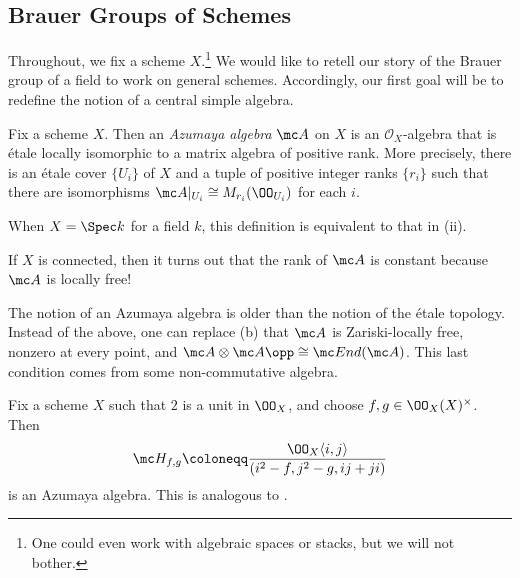 \documentclass[../notes.tex]{subfiles}
\begin{document}
\subsection{Brauer Groups of Schemes}
Throughout, we fix a scheme $X$.\footnote{One could even work with algebraic spaces or stacks, but we will not bother.} We would like to retell our story of the Brauer group of a field to work on general schemes. Accordingly, our first goal will be to redefine the notion of a central simple algebra.
\begin{definition}
	Fix a scheme $X$. Then an \textit{Azumaya algebra} $\mc A$ on $X$ is an $\mathcal O_X$-algebra that is \'etale locally isomorphic to a matrix algebra of positive rank. More precisely, there is an \'etale cover $\{U_i\}$ of $X$ and a tuple of positive integer ranks $\{r_i\}$ such that there are isomorphisms $\mc A|_{U_i}\cong M_{r_i}(\OO_{U_i})$ for each $i$.
\end{definition}
\begin{remark}
	When $X=\Spec k$ for a field $k$, this definition is equivalent to that in (ii).
\end{remark}
\begin{remark}
	If $X$ is connected, then it turns out that the rank of $\mc A$ is constant because $\mc A$ is locally free!
\end{remark}
\begin{remark} \label{rem:different-azumaya}
	The notion of an Azumaya algebra is older than the notion of the \'etale topology. Instead of the above, one can replace (b) that $\mc A$ is Zariski-locally free, nonzero at every point, and $\mc A\otimes\mc A\opp\cong\mc End(\mc A)$. This last condition comes from some non-commutative algebra.
\end{remark}
\begin{example}
	Fix a scheme $X$ such that $2$ is a unit in $\OO_X$, and choose $f,g\in\OO_X(X)^\times$. Then
	\[\mc H_{f,g}\coloneqq\frac{\OO_X\langle i,j\rangle}{\left(i^2-f,j^2-g,ij+ji\right)}\]
	is an Azumaya algebra. This is analogous to .
\end{example}
\end{document}
